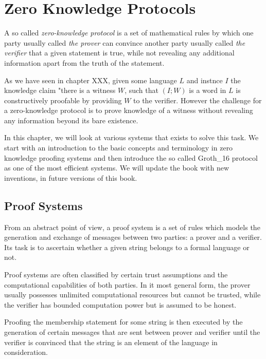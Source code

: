 \chapter{Zero Knowledge Protocols}
A so called \textit{zero-knowledge protocol} is a set of mathematical rules by which one party usually called \textit{the prover} can convince another party usually called \textit{the verifier} that a given statement is true, while not revealing any additional information apart from the truth of the statement. 

As we have seen in chapter XXX, given some language $L$ and instnce $I$ the knowledge claim "there is a witness $W$, such that $(I;W)$ is a word in $L$ is constructively proofable by providing $W$ to the verifier. However the challenge for a zero-knowledge protocol is to prove knowledge of a witness without revealing any information beyond its bare existence.

In this chapter, we will look at various systems that exists to solve this task. We start with an introduction to the basic concepts and terminology in zero knowledge proofing systems and then introduce the so called Groth\_16 protocol as one of the most efficient systems. We will update the book with new inventions, in future versions of this book.

\section{Proof Systems}
From an abstract point of view, a proof system is a set of rules which models the generation and exchange of messages between two parties: a prover and a verifier. Its task is to ascertain whether a given string belongs to a formal language or not.  

Proof systems are often classified by certain trust assumptions and the computational capabilities of both parties. In it most general form, the prover usually possesses unlimited computational resources but cannot be trusted, while the verifier has bounded computation power but is assumed to be honest.

Proofing the membership statement for some string is then executed by the generation of certain messages that are sent between prover and verifier until the verifier is convinced that the string is an element of the language in consideration.

